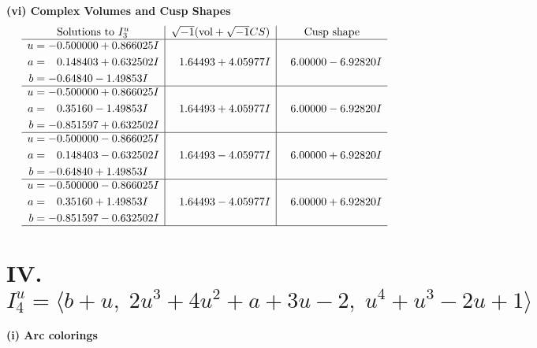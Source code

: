 \documentclass[1p]{elsarticle_modified}
\theoremstyle{definition}
\newcommand{\I}{\sqrt{-1}}
\begin{document}
\newpage\flushleft \textbf{(vi) Complex Volumes and Cusp Shapes}
$$\begin{array}{c|c|c}  
\text{Solutions to }I^u_{3}& \I (\text{vol} + \sqrt{-1}CS) & \text{Cusp shape}\\
 \hline 
\begin{aligned}
u &= -0.500000 + 0.866025 I \\
a &= \phantom{-}0.148403 + 0.632502 I \\
b &= -0.64840 - 1.49853 I\end{aligned}
 & \phantom{-}1.64493 + 4.05977 I & \phantom{-}6.00000 - 6.92820 I \\ \hline\begin{aligned}
u &= -0.500000 + 0.866025 I \\
a &= \phantom{-}0.35160 - 1.49853 I \\
b &= -0.851597 + 0.632502 I\end{aligned}
 & \phantom{-}1.64493 + 4.05977 I & \phantom{-}6.00000 - 6.92820 I \\ \hline\begin{aligned}
u &= -0.500000 - 0.866025 I \\
a &= \phantom{-}0.148403 - 0.632502 I \\
b &= -0.64840 + 1.49853 I\end{aligned}
 & \phantom{-}1.64493 - 4.05977 I & \phantom{-}6.00000 + 6.92820 I \\ \hline\begin{aligned}
u &= -0.500000 - 0.866025 I \\
a &= \phantom{-}0.35160 + 1.49853 I \\
b &= -0.851597 - 0.632502 I\end{aligned}
 & \phantom{-}1.64493 - 4.05977 I & \phantom{-}6.00000 + 6.92820 I\\
 \hline 
 \end{array}$$\newpage\newpage\renewcommand{\arraystretch}{1}
\centering \section*{IV. $I^u_{4}= \langle b+u,\;2 u^3+4 u^2+a+3 u-2,\;u^4+u^3-2 u+1 \rangle$}
\flushleft \textbf{(i) Arc colorings}\\
\end{document}

